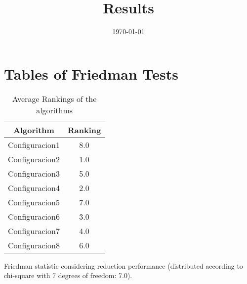 \documentclass{article}
\title{Results}
\author{}
\date{\today}
\begin{document}
\oddsidemargin 0in \topmargin 0in\maketitle
\section{Tables of Friedman Tests}
\begin{table}[!htp]
\centering
\caption{Average Rankings of the algorithms
}\begin{tabular}{c|c}
Algorithm&Ranking\\
\hline
Configuracion1&8.0\\
Configuracion2&1.0\\
Configuracion3&5.0\\
Configuracion4&2.0\\
Configuracion5&7.0\\
Configuracion6&3.0\\
Configuracion7&4.0\\
Configuracion8&6.0\\
\end{tabular}
\end{table}


Friedman statistic considering reduction performance (distributed according to chi-square with 7 degrees of freedom: 7.0).
\end{document}
